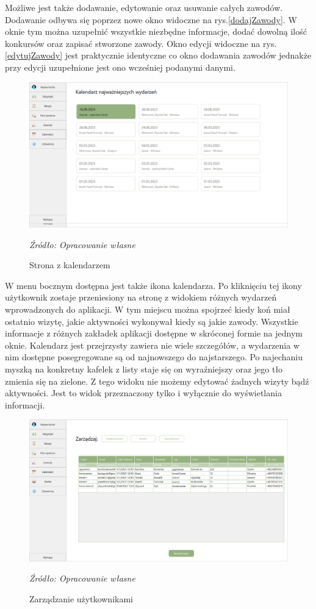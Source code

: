 \documentclass[12pt,oneside]{report}
\begin{document}
Możliwe jest także dodawanie, edytowanie oraz usuwanie całych zawodów. Dodawanie odbywa się poprzez nowe okno widoczne na rys.\ref{dodajZawody}. W oknie tym można uzupełnić wszystkie niezbędne informacje, dodać dowolną ilość konkursów oraz zapisać stworzone zawody. Okno edycji widoczne na rys. \ref{edytujZawody} jest praktycznie identyczne co okno dodawania zawodów jednakże przy edycji uzupełnione jest ono wcześniej podanymi danymi.
\begin{figure}[H]
\centering
\includegraphics[scale=0.4]{kalendarz}
\caption{Strona z kalendarzem}
\textit{Źródło: Opracowanie własne}
\label{Kalendarz}
\end{figure}
W menu bocznym dostępna jest także ikona kalendarza. Po kliknięciu tej ikony użytkownik zostaje przeniesiony na stronę z widokiem różnych wydarzeń wprowadzonych do aplikacji. W tym miejscu można spojrzeć kiedy koń miał ostatnio wizytę, jakie aktywności wykonywał kiedy są jakie zawody. Wszystkie informacje z różnych zakładek aplikacji dostępne w skróconej formie na jednym oknie. Kalendarz jest przejrzysty zawiera nie wiele szczegółów, a wydarzenia w nim dostępne posegregowane są od najnowszego do najstarszego. Po najechaniu myszką na konkretny kafelek z listy staje się on wyraźniejszy oraz jego tło zmienia się na zielone. Z tego widoku nie możemy edytować żadnych wizyty bądź aktywności. Jest to widok przeznaczony tylko i wyłącznie do wyświetlania informacji.
\begin{figure}[H]
\centering
\includegraphics[scale=0.4]{ZarzadzanieUzytkownikami}
\caption{Zarządzanie użytkownikami}
\textit{Źródło: Opracowanie własne}
\label{Uzytkownicy}
\end{figure}
\end{document}
